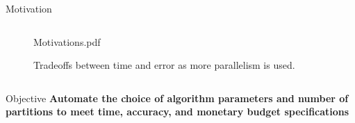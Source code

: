 \documentclass[final]{beamer}
\begin{document}
{\begin{frame}{}
\begin{center}
\begin{columns}[t]
\begin{column}{0.32\textwidth}
\begin{block}{\huge Motivation}
\begin{columns}[t]
\begin{column}{0.45\textwidth}
\begin{center}
\begin{figure}
{{Motivations.pdf}}
\caption{Tradeoffs between time and error as more parallelism is used.}
\end{figure}
\end{center}
\end{column}
\end{columns}
\vspace{1.0cm}

\end{block}
\vspace{1.8cm}

    \begin{block}{\huge Objective}
\vspace{.6cm}
	{\bf \Large Automate the choice of algorithm parameters and number of partitions to meet time, accuracy, and monetary budget specifications}

\vspace{.6cm}

\end{block}

\vspace{1.8cm}


\end{column}
\end{columns}
\end{center}
\end{frame}}
\end{document}
